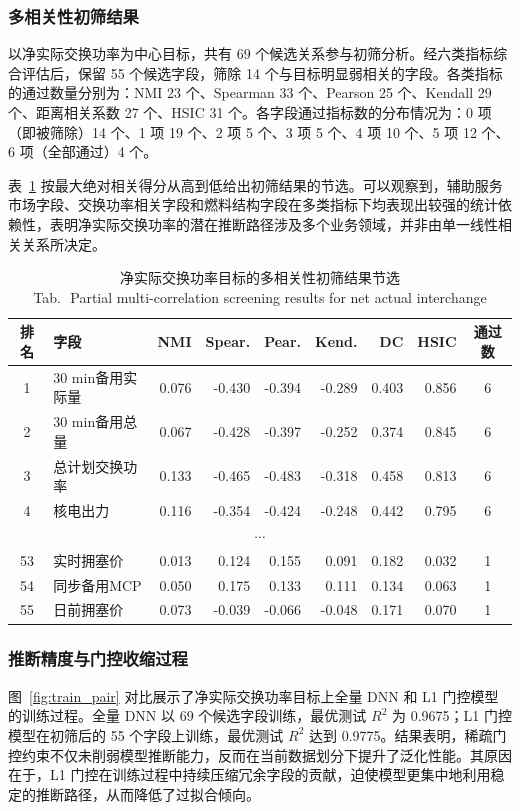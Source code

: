 \documentclass[UTF8,zihao=5,twoside]{ctexart}
\numberwithin{equation}{section}
\newcommand{\tabbicaption}[2]{%
  \caption{#1\\[-0.2em]\small Tab.\,\thetable\ #2}
}
\begin{document}
\subsubsection{多相关性初筛结果}
以净实际交换功率为中心目标，共有 69 个候选关系参与初筛分析。经六类指标综合评估后，保留 55 个候选字段，筛除 14 个与目标明显弱相关的字段。各类指标的通过数量分别为：NMI 23 个、Spearman 33 个、Pearson 25 个、Kendall 29 个、距离相关系数 27 个、HSIC 31 个。各字段通过指标数的分布情况为：0 项（即被筛除）14 个、1 项 19 个、2 项 5 个、3 项 5 个、4 项 10 个、5 项 12 个、6 项（全部通过）4 个。

表~\ref{tab:screening_top} 按最大绝对相关得分从高到低给出初筛结果的节选。可以观察到，辅助服务市场字段、交换功率相关字段和燃料结构字段在多类指标下均表现出较强的统计依赖性，表明净实际交换功率的潜在推断路径涉及多个业务领域，并非由单一线性相关关系所决定。

\begin{table}[!tbp]
\centering
\scriptsize
\setlength{\tabcolsep}{1pt}
\tabbicaption{净实际交换功率目标的多相关性初筛结果节选}{Partial multi-correlation screening results for net actual interchange}
\label{tab:screening_top}
\begin{tabularx}{\columnwidth}{cXrrrrrrc}
\toprule
排名 & 字段 & NMI & Spear. & Pear. & Kend. & DC & HSIC & 通过数 \\
\midrule
1 & 30 min备用实际量 & 0.076 & -0.430 & -0.394 & -0.289 & 0.403 & 0.856 & 6 \\
2 & 30 min备用总量 & 0.067 & -0.428 & -0.397 & -0.252 & 0.374 & 0.845 & 6 \\
3 & 总计划交换功率 & 0.133 & -0.465 & -0.483 & -0.318 & 0.458 & 0.813 & 6 \\
4 & 核电出力 & 0.116 & -0.354 & -0.424 & -0.248 & 0.442 & 0.795 & 6 \\
\multicolumn{9}{c}{\(\cdots\)} \\
53 & 实时拥塞价 & 0.013 & 0.124 & 0.155 & 0.091 & 0.182 & 0.032 & 1 \\
54 & 同步备用MCP & 0.050 & 0.175 & 0.133 & 0.111 & 0.134 & 0.063 & 1 \\
55 & 日前拥塞价 & 0.073 & -0.039 & -0.066 & -0.048 & 0.171 & 0.070 & 1 \\
\bottomrule
\end{tabularx}
\end{table}

\subsubsection{推断精度与门控收缩过程}
图~\ref{fig:train_pair} 对比展示了净实际交换功率目标上全量 DNN 和 L1 门控模型的训练过程。全量 DNN 以 69 个候选字段训练，最优测试 $R^2$ 为 0.9675；L1 门控模型在初筛后的 55 个字段上训练，最优测试 $R^2$ 达到 0.9775。结果表明，稀疏门控约束不仅未削弱模型推断能力，反而在当前数据划分下提升了泛化性能。其原因在于，L1 门控在训练过程中持续压缩冗余字段的贡献，迫使模型更集中地利用稳定的推断路径，从而降低了过拟合倾向。
\end{document}
